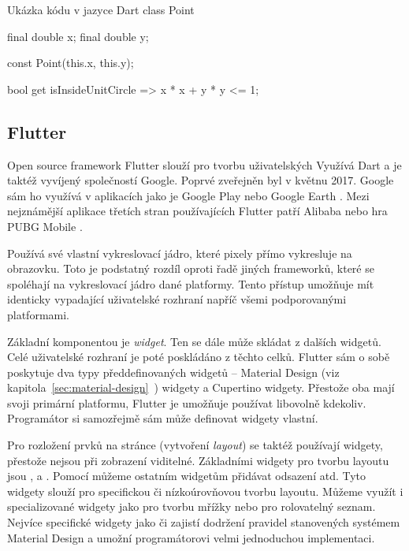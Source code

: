 \documentclass[
  biblatex,
  figures=true,
  tables=false,
  glossaries,
  index
]{kidiplom}
\begin{document}
\begin{kicode}{}{}{Ukázka kódu v jazyce Dart}
class Point {
  final double x;
  final double y;

  const Point(this.x, this.y);

  bool get isInsideUnitCircle => x * x + y * y <= 1;
}
\end{kicode}

\subsection{Flutter}
Open source framework Flutter \cite{flutter} slouží pro tvorbu uživatelských Využívá Dart a je taktéž vyvíjený společností Google. Poprvé zveřejněn byl v květnu 2017. Google sám ho využívá v aplikacích jako je Google Play nebo Google Earth \cite{flutter-showcase}. Mezi nejznámější aplikace třetích stran používajících Flutter patří Alibaba nebo hra PUBG Mobile \cite{flutter-showcase}.

Používá své vlastní vykreslovací jádro, které pixely přímo vykresluje na obrazovku. Toto je podstatný rozdíl oproti řadě jiných frameworků, které se spoléhají na vykreslovací jádro dané platformy. Tento přístup umožňuje mít identicky vypadající uživatelské rozhraní napříč všemi podporovanými platformami.

Základní komponentou je \textit{widget}. Ten se dále může skládat z dalších widgetů. Celé uživatelské rozhraní je poté poskládáno z těchto celků. Flutter sám o sobě poskytuje dva typy předdefinovaných widgetů -- Material Design (viz kapitola~\ref{sec:material-design}~) widgety a Cupertino widgety. Přestože oba mají svoji primární platformu, Flutter je umožňuje používat libovolně kdekoliv. Programátor si samozřejmě sám může definovat widgety vlastní.

Pro rozložení prvků na stránce (vytvoření \textit{layout}) se taktéž používají widgety, přestože nejsou při zobrazení viditelné. Základními widgety pro tvorbu layoutu jsou ,  a . Pomocí  můžeme ostatním widgetům přidávat odsazení atd. Tyto widgety slouží pro specifickou či nízkoúrovňovou tvorbu layoutu. Můžeme využít i specializované widgety jako  pro tvorbu mřížky nebo  pro rolovatelný seznam. Nejvíce specifické widgety jako  či  zajistí dodržení pravidel stanovených systémem Material Design a umožní programátorovi velmi jednoduchou implementaci.
\end{document}
